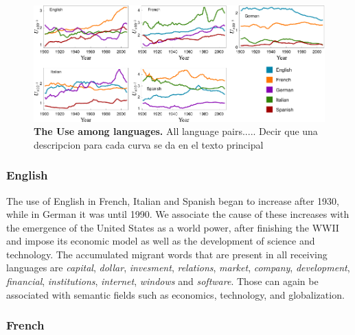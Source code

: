 \documentclass[10pt,letterpaper]{article} %
\begin{document}


\begin{figure}[!h]
	\begin{adjustwidth}{-2cm}{1cm}
		\centering
		\includegraphics{images/usoFinal.pdf}
		\caption{{\bf The Use among languages.}  All language pairs..... Decir que una descripcion para 
cada curva se da en el texto principal}
		\label{fig.UT_art}
	\end{adjustwidth}
\end{figure}
\subsubsection*{English} %

The use of English in French, Italian and Spanish began to increase after 1930, while in German it was until 1990. We associate the cause of these increases with the emergence of the United States as a world power, after finishing the WWII and  impose its economic model as well as the development of science and technology. The accumulated migrant words that are present in all receiving  languages are \textit{capital}, \textit{dollar}, \textit{invesment}, \textit{relations}, \textit{market}, \textit{company}, \textit{development}, \textit{financial},  \textit{institutions}, \textit{internet}, \textit{windows} and \textit{software}. Those can again be associated with semantic fields such as economics, technology, and globalization.

\subsubsection*{French} %
\end{document}
